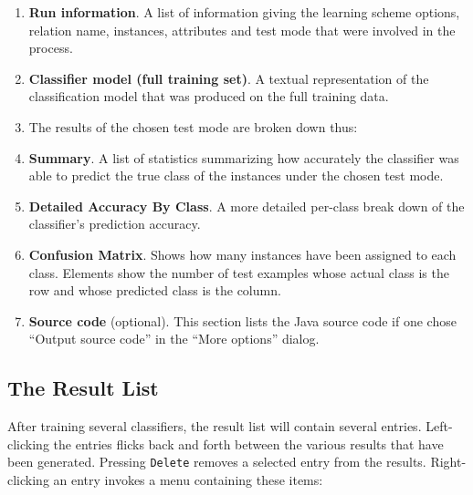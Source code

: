 \documentclass[a4paper]{article}
\begin{document}
\begin{enumerate}
\item \textbf{Run information}.
A list of information giving the learning scheme options, relation name,
instances, attributes and test mode that were involved in the process.
\item \textbf{Classifier model (full training set)}.
A textual representation of the classification model that was produced on the
full training data. 
\item The results of the chosen test mode are broken down thus:
\item \textbf{Summary}.
A list of statistics summarizing how accurately the classifier was able to
predict the true class of the instances under the chosen test mode. 
\item \textbf{Detailed Accuracy By Class}.
A more detailed per-class break down of the classifier's prediction accuracy. 
\item \textbf{Confusion Matrix}.
Shows how many instances have been assigned to each class. Elements show the
number of test examples whose actual class is the row and whose predicted class
is the column.
\item \textbf{Source code} (optional).
This section lists the Java source code if one chose ``Output source code'' in 
the ``More options'' dialog.
\end{enumerate}

\subsection{The Result List}

After training several classifiers, the result list will contain several
entries.  Left-clicking the entries flicks back and forth between the various
results that have been generated. Pressing \texttt{Delete} removes a selected 
entry from the results. Right-clicking an entry invokes a menu containing these items:
\end{document}
